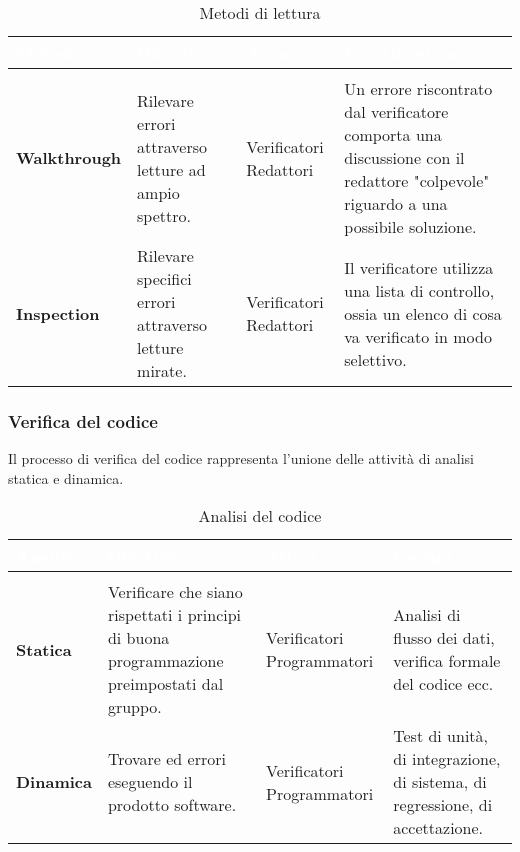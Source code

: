 \renewcommand{\arraystretch}{1.5}
\renewcommand\extrarowheight{1.5pt}
\begin{longtable}{C{3cm} | C{4cm} C{3cm} C{5cm}}
		\textcolor{white}{\textbf{Metodo}} & 
		\textcolor{white}{\textbf{Obiettivo}} & 
		\textcolor{white}{\textbf{Attori}} & 
		\textcolor{white}{\textbf{Caratteristica}} \\
		\endfirsthead
		\\
	    \endfoot
	    \caption{Metodi di lettura}
	    \endlastfoot
		\hline
		\textbf{Walkthrough} & 
		Rilevare errori attraverso letture ad ampio spettro. & 
		Verificatori \newline Redattori & 
		Un errore riscontrato dal verificatore comporta una discussione con il redattore "colpevole" riguardo a una possibile soluzione. \\
		\textbf{Inspection} & 
		Rilevare specifici errori attraverso letture mirate. & 
		Verificatori \newline Redattori & 
		Il verificatore utilizza una lista di controllo, ossia un elenco di cosa va verificato in modo selettivo. \\
\end{longtable}

\subsubsection{Verifica del codice}
Il processo di verifica del codice rappresenta l'unione delle attività di analisi statica e dinamica. 

\renewcommand{\arraystretch}{1.5}
\renewcommand\extrarowheight{1.5pt}
\begin{longtable}{C{3cm} | C{4cm} C{3cm} C{5cm}}
		\textcolor{white}{\textbf{Analisi}} & 
		\textcolor{white}{\textbf{Obiettivo}} & 
		\textcolor{white}{\textbf{Attori}} & 
		\textcolor{white}{\textbf{Esempi}} \\
		\endfirsthead
		\\
	    \endfoot
	    \caption{Analisi del codice}
	    \endlastfoot
		\hline
		\textbf{Statica} & 
		Verificare che siano rispettati i principi di buona programmazione preimpostati dal gruppo. & 
		Verificatori \newline Programmatori & 
		Analisi di flusso dei dati, verifica formale del codice ecc. \\
		\textbf{Dinamica} & 
		Trovare  ed errori eseguendo il prodotto software.  & 
		Verificatori \newline Programmatori & 
		Test di unità, di integrazione, di sistema, di regressione, di accettazione. \\
\end{longtable}

